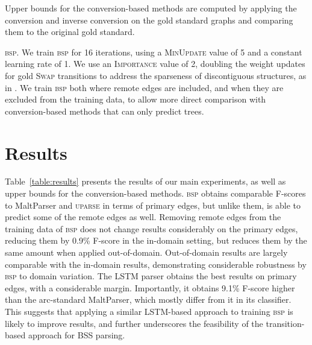\documentclass[11pt]{article}
\makeatletter
\newcommand{\tabref}[1]{Table~\ref{#1}}
\renewcommand{\paragraph}{
  \@startsection{paragraph}{4}
  {\z@}{.5ex \@plus .5ex \@minus .2ex}{-1em}
  {\normalfont\normalsize\bfseries}
}
\makeatother
\begin{document}


Upper bounds for the conversion-based methods are computed by applying
the conversion and inverse conversion on the gold standard
graphs and comparing them to the original gold standard.

\paragraph{\textsc{bsp}.}
We train \textsc{bsp} for 16 iterations, using a \textsc{MinUpdate} value of 5 and a constant learning rate of 1.
We use an \textsc{Importance} value of 2, doubling the weight updates
for gold \textsc{Swap} transitions to address the sparseness
of discontiguous structures, as in \cite{maier2015discontinuous}.
We train \textsc{bsp} both where remote edges
are included, and when they are excluded from the training data, to allow
more direct comparison with conversion-based methods that can only
predict trees.

\section{Results}\label{sec:results}

\tabref{table:results} presents the results of our main experiments, as well as
upper bounds for the conversion-based methods.
\textsc{bsp} obtains comparable F-scores to MaltParser and \textsc{uparse}
in terms of primary edges, but unlike them, is able to predict some
of the remote edges as well. 
Removing remote edges from the training data of \textsc{bsp} does not
change results considerably on the primary edges,
reducing them by 0.9\% F-score in the in-domain setting, but reduces
them by the same amount when applied out-of-domain. 
Out-of-domain results are largely comparable with the in-domain
results, demonstrating considerable robustness by \textsc{bsp}
to domain variation.
The LSTM parser obtains the best results on primary edges,
with a considerable margin. Importantly, it obtains 9.1\%
F-score higher than the arc-standard MaltParser, which
mostly differ from it in its classifier.
This suggests that applying a similar LSTM-based approach to
training \textsc{bsp} is likely to improve results,
and further underscores the feasibility of the transition-based
approach for BSS parsing. 
\end{document}
